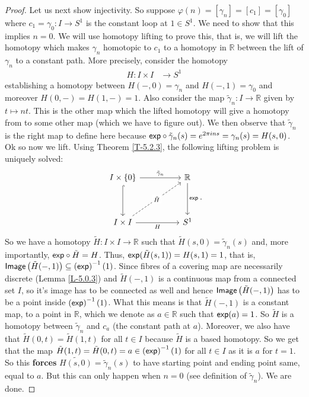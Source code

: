 \documentclass[letterpaper,11pt,twoside]{article}
\theoremstyle{definition}
\theoremstyle{definition}
\theoremstyle{definition}
\theoremstyle{definition}
\theoremstyle{definition}
\theoremstyle{definition}
\theoremstyle{remark}
\theoremstyle{definition}
\newcommand{\Image}[1]{{\fontfamily{lmss}\selectfont 
		\text{Image}\left (#1\right )
}}
\newcommand{\R}[0]{\mathbb{R}}
\newcommand{\inv}[1]{\left(#1\right)^{-1}}
\renewcommand{\exp}[0]{{\fontfamily{lmss}\selectfont 
        \text{exp}
}}
\begin{document}
\begin{proof}
Let us next show injectivity. So suppose $\varphi(n)  =[\gamma_n] =[c_1] = [\gamma_0]$ where $c_1 = \gamma_0 : I \to S^1$ is the constant loop at $1\in S^1$. We need to show that this implies $n=0$. We will use homotopy lifting to prove this, that is, we will lift the homotopy which makes $\gamma_n$ homotopic to $c_1$ to a homotopy in $\R$ between the lift of $\gamma_n$ to a constant path. More precisely, consider the homotopy 
\begin{align*}
    H: I \times I &\longrightarrow S^1
\end{align*}
establishing a homotopy between $H(-,0) = \gamma_n$ and $H(-,1) = \gamma_0$ and moreover $H(0,-) = H(1,-) = 1$. Also consider the map $\tilde{\gamma}_n : I \longrightarrow \R$ given by $t \longmapsto nt$. This is the other map which the lifted homotopy will give a homotopy from to some other map (which we have to figure out). We then observe that $\tilde{\gamma}_n$ is the right map to define here because $\exp \circ \tilde{\gamma}_n(s) = e^{2\pi i ns} = \gamma_n(s) = H(s,0)$. Ok so now we lift. Using Theorem \ref{T-5.2.3}, the following lifting problem is uniquely solved:
\[\begin{tikzcd}
	{I\times\{0\}} && \R \\
	\\
	{I\times I} && {S^1}
	\arrow["H"', from=3-1, to=3-3]
	\arrow["\exp", from=1-3, to=3-3]
	\arrow[hook, from=1-1, to=3-1]
	\arrow["{\tilde{\gamma}_n}", from=1-1, to=1-3]
	\arrow["{\tilde{H}}"{description}, dashed, from=3-1, to=1-3]
\end{tikzcd}.\]
So we have a homotopy $\tilde{H} : I\times I \longrightarrow \R$ such that $\tilde{H}(s,0) = \tilde{\gamma}_n(s)$ and, more importantly, $\exp \circ \tilde{H} = H$. Thus, $\exp (\tilde{H}(s,1)) = H(s,1) = 1$, that is, $\Image{ \tilde{H}(-,1)} \subseteq \inv{\exp }(1)$. Since fibres of a covering map are necessarily discrete (Lemma \ref{L-5.0.3}) and $\tilde{H}(-,1)$ is a continuous map from a connected set $I$, so it's image has to be connected as well and hence $\Image{\tilde{H}(-,1)}$ has to be a point inside $\inv{\exp}(1)$. What this means is that $\tilde{H}(-,1)$ is a constant map, to a point in $\R$, which we denote as $a\in \R$ such that $\exp (a) =1$. So $\tilde{H}$ is a homotopy between $\tilde{\gamma}_n$ and $c_a$ (the constant path at $a$). Moreover, we also have that $\tilde{H}(0,t)= \tilde{H}(1,t) $ for all $t\in I$ because $\tilde{H}$ is a based homotopy. So we get that the map $\tilde{H}(1,t) = \tilde{H}(0,t) = a \in \inv{\exp}(1)$ for all $t\in I$ as it is $a$ for $t=1$. So this \textbf{forces} $\tilde{H(s,0)} =\tilde{\gamma}_n(s) $ to have starting point and ending point same, equal to $a$. But this can only happen when $n=0$ (see definition of $\tilde{\gamma}_n$). We are done.
\end{proof}
\end{document}
